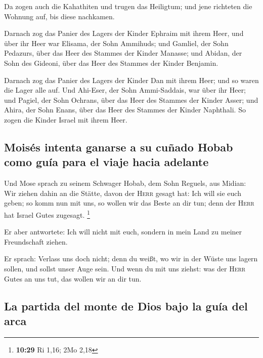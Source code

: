  Da zogen auch die Kahathiten und trugen das Heiligtum;
und jene richteten die Wohnung auf, bis diese nachkamen.

 Darnach zog das Panier des Lagers der Kinder Ephraim mit
ihrem Heer, und über ihr Heer war Elisama, der Sohn Ammihuds;
 und Gamliel, der Sohn Pedazurs, über das Heer des
Stammes der Kinder Manasse;  und Abidan, der Sohn des
Gideoni, über das Heer des Stammes der Kinder Benjamin.

 Darnach zog das Panier des Lagers der Kinder Dan mit
ihrem Heer; und so waren die Lager alle auf. Und Ahi-Eser, der Sohn
Ammi-Saddais, war über ihr Heer;  und Pagiel, der Sohn
Ochrans, über das Heer des Stammes der Kinder Asser;  und
Ahira, der Sohn Enans, über das Heer des Stammes der Kinder Naphthali.
 So zogen die Kinder Israel mit ihrem Heer.

\hypertarget{moisuxe9s-intenta-ganarse-a-su-cuuxf1ado-hobab-como-guuxeda-para-el-viaje-hacia-adelante}{%
\subsection{Moisés intenta ganarse a su cuñado Hobab como guía para el
viaje hacia
adelante}\label{moisuxe9s-intenta-ganarse-a-su-cuuxf1ado-hobab-como-guuxeda-para-el-viaje-hacia-adelante}}

 Und Mose sprach zu seinem Schwager Hobab, dem Sohn
Reguels, aus Midian: Wir ziehen dahin an die Stätte, davon der
\textsc{Herr} gesagt hat: Ich will sie euch geben; so komm nun mit uns,
so wollen wir das Beste an dir tun; denn der \textsc{Herr} hat Israel
Gutes zugesagt. \footnote{\textbf{10:29} Ri 1,16; 2Mo 2,18}

 Er aber antwortete: Ich will nicht mit euch, sondern in
mein Land zu meiner Freundschaft ziehen.

 Er sprach: Verlass uns doch nicht; denn du weißt, wo wir
in der Wüste uns lagern sollen, und sollst unser Auge sein.
 Und wenn du mit uns ziehst: was der \textsc{Herr} Gutes
an uns tut, das wollen wir an dir tun.

\hypertarget{la-partida-del-monte-de-dios-bajo-la-guuxeda-del-arca}{%
\subsection{La partida del monte de Dios bajo la guía del
arca}\label{la-partida-del-monte-de-dios-bajo-la-guuxeda-del-arca}}

